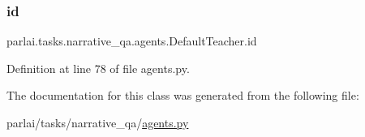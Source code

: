 \subsubsection{\texorpdfstring{id}{id}}
{\footnotesize\ttfamily parlai.\+tasks.\+narrative\+\_\+qa.\+agents.\+Default\+Teacher.\+id}



Definition at line 78 of file agents.\+py.



The documentation for this class was generated from the following file\+:\begin{DoxyCompactItemize}
\item 
parlai/tasks/narrative\+\_\+qa/\hyperlink{parlai_2tasks_2narrative__qa_2agents_8py}{agents.\+py}\end{DoxyCompactItemize}
